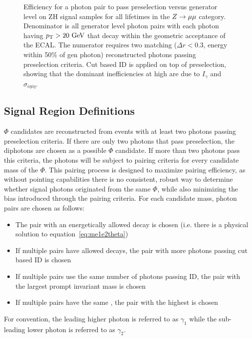 \begin{figure}[htb!]
\begin{tabular}{>{\centering\arraybackslash}m{0.32\linewidth} >{\centering\arraybackslash}m{0.32\linewidth} >{\centering\arraybackslash}m{0.32\linewidth}}
	\end{tabular}
	\caption[Efficiency for a photon pair to pass preselection versus generator level \lxy on ZH signal samples for all lifetimes in the $\VZ\to\mu\mu$ category.]{Efficiency for a photon pair to pass preselection versus generator level \lxy on ZH signal samples for all lifetimes in the $\VZ\to\mu\mu$ category. Denominator is all generator level photon pairs with each photon having $\pt>20\unit{GeV}$ that decay within the geometric acceptance of the ECAL. The numerator requires two matching ($\Delta r<0.3$, energy within 50\% of gen photon) reconstructed photons passing preselection criteria. Cut based ID is applied on top of preselection, showing that the dominant inefficiencies at high \lxy are due to $I_\gamma$ and $\sigma_{i\eta i\eta}$.}
	\label{fig:Photon_cutBased}
\end{figure}

\subsection{Signal Region Definitions} \label{sec:ana_signalregion}
$\Phi$ candidates are reconstructed from events with at least two photons passing preselection criteria. If there are only two photons that pass preselection, the diphotons are chosen as a possible $\Phi$ candidate. If more than two photons pass this criteria, the photons will be subject to pairing criteria for every candidate mass of the $\Phi$. This pairing process is designed to maximize pairing efficiency, as without pointing capabilities there is no consistent, robust way to determine whether signal photons originated from the same $\Phi$, while also minimizing the bias introduced through the pairing criteria. For each candidate mass, photon pairs are chosen as follows:
\begin{itemize}
	\item The pair with an energetically allowed decay is chosen (i.e. there is a physical solution to equation~\ref{eq:me1e2theta})
	\item If multiple pairs have allowed decays, the pair with more photons passing cut based ID is chosen
	\item If multiple pairs use the same number of photons passing ID, the pair with the largest prompt invariant mass \mgg is chosen
	\item If multiple pairs have the same \mgg, the pair with the highest \ptgg is chosen
\end{itemize}
For convention, the leading higher \pt photon is referred to as $\gamma_1$ while the sub-leading lower \pt photon is referred to as $\gamma_2$.

